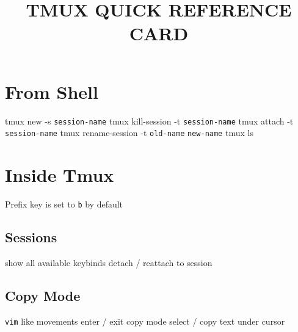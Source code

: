 
\def\cmdOptL#1#2{
  \noindent
  \hbox to \hsize {%
    \vtop{
      \hbox to 2.4cm {
      \hskip 15pt
      \noindent\cmd{\tt--#1}
      \hfil
      }
    }%
    \hfil	%
    \vtop{
      \hsize=5.90cm
      \hbox{\hfuzz = 15pt \vtop{
      {#2}
      }}
    }
  }
  \par
  \vskip 0.14cm
}


\def\cmdOptLl#1#2{
    \hsize=8.5cm
    \vbox {
        \hbox{
      \hskip 15pt
      \noindent\cmd{\tt--#1}
      \hfil
        }%
        \hskip 70pt  %
        \hbox to 5.9cm {%
            \hfuzz = 5pt
            \hfil
            \hsize=5.9cm
            \vtop{
                {#2}
            }}
    }%
    \par
    \vskip 0.14cm
}


\title{TMUX QUICK REFERENCE CARD}

\shortintro

\section{From Shell}{}

	{tmux new -s {\tt session-name}}
	{tmux kill-session -t {\tt session-name}}
	{tmux attach -t {\tt session-name}}
	{tmux rename-session -t {\tt old-name} {\tt new-name}}
	{tmux ls}

\section{Inside Tmux}{Prefix key is set to {\tt \ctrl b} by default}

\subsection{Sessions}{}
	{show all available keybinds}
	{detach / reattach to session}

\subsection{Copy Mode}{{\tt vim} like movements}
	{enter / exit copy mode}
	{select / copy text under cursor}

